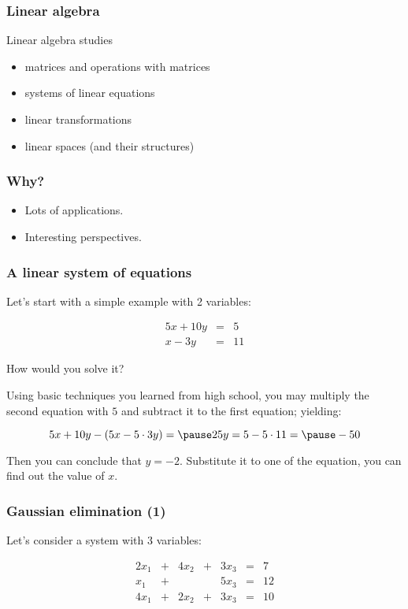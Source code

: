 

\begin{frame}
  \frametitle{Linear algebra}

  Linear algebra studies 
  \begin{itemize}
  \item matrices and operations with matrices
  \item systems of linear equations
  \item linear transformations
  \item linear spaces (and their structures)
  \end{itemize}
\end{frame}

\begin{frame}
  \frametitle{Why?}

  \begin{itemize}
  \item Lots of applications.
  \item Interesting perspectives.
  \end{itemize}
\end{frame}

\begin{frame}\frametitle{A linear system of equations}
  Let's start with a simple example with 2 variables:

  \[
  \begin{array}{rcl}
  5x + 10y &=& 5 \\
  x - 3y &=& 11
  \end{array}
  \]

  How would you solve it?

  \pause

  Using basic techniques you learned from high school, you may
  multiply the second equation with $5$ and subtract it to the first
  equation; yielding:

  \[
    5x + 10y - (5x - 5\cdot 3y) =
    \pause 25y = 5 - 5\cdot 11 =
    \pause -50
  \]

  \pause

  Then you can conclude that $y=-2$.  Substitute it to one of the
  equation, you can find out the value of $x$.

\end{frame}

\begin{frame}
  \frametitle{Gaussian elimination (1)}
  Let's consider a system with 3 variables:

  \[
  \begin{array}{rcrcrcl}
    2x_1 & + & 4x_2 & + & 3x_3 & = & 7 \\
    x_1 & + &  &  & 5x_3 & = & 12 \\
    4x_1 & + & 2x_2 & + & 3x_3 & = & 10
  \end{array}
  \]

  \vspace{2in}

\end{frame}

